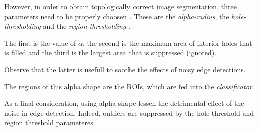         \par{
            However, in order to obtain topologically correct image segmentation, three parameters need to be properly choosen \cite{springer:10.1007/11907350_46}. These are the \emph{alpha-radius}, the \emph{hole-thresholding} and the \emph{region-thresholding} \cite{matlab:alpha-shape}.
        }
        \par{
            The first is the value of $\alpha$, the second is the maximum area of interior holes that is filled and the third is the largest area that is suppressed (ignored).
        }
        \par{
            Observe that the latter is usefull to soothe the effects of noisy edge detections.
        }
	    \par{
		    The regions of this alpha shape are the ROIs, which are fed into the \emph{classificator}.
		}
        \par{
            As a final consideration, using alpha shape lessen the detrimental effect of the noise in edge detection. Indeed, outliers are suppressed by the hole threshold and region threshold parameteres.
        }
